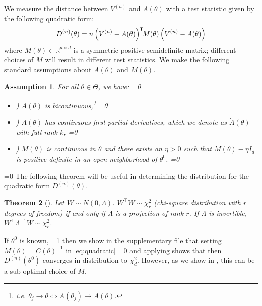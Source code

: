 \documentclass[twoside,letterpaper]{article} \usepackage{aistats2017}
\newtheorem{theorem}{Theorem}[section]
\newtheorem{assumpt}[theorem]{Assumption}
\theoremstyle{definition}
\theoremstyle{remark}
\begin{document}
 We measure the distance between ${V^{({n})}}$ and $A(\theta)$ with a test statistic given by the following quadratic form:
\begin{equation}
{D^{({n})}}(\theta) = n \left({V^{({n})}} - A(\theta) \right)^\intercal \hspace{-0.3em}M(\theta) \left( {V^{({n})}} - A(\theta)\right)
\label{eq:quadratic}
\end{equation}
where $M(\theta) \in {\mathbb{R}}^{d\times d}$ is a symmetric positive-semidefinite matrix; different choices of $M$ will result in different test statistics.
We make the following standard assumptions about $A(\theta)$ and $M(\theta)$. 
\begin{assumpt} For all $\theta \in \Theta$, we have:
=0
\begin{itemize}
\item {}) \fi $A(\theta)$ is bicontinuous,\footnote{i.e. $\theta_j\rightarrow\theta\Leftrightarrow A(\theta_j)\rightarrow A(\theta)$.}
=0 \item {}) \fi  $A(\theta)$ has continuous first partial derivatives, which we denote as $\dot{ A}(\theta)$ with full rank $k$,
=0 \item {}) \fi  $M(\theta)$ is continuous in $\theta$ and there exists an $\eta >0$ such that $M(\theta) - \eta I_d$ is positive definite in an open neighborhood of ${\theta^0}$.
=0
\end{itemize}
\fi
\label{assumpt:mean}
\end{assumpt} 

=0
The following theorem will be useful in determining the distribution for the quadratic form ${D^{({n})}}(\theta)$.
\begin{theorem}[\cite{Ferg96}]
Let $W \sim N(0,\Lambda)$. $W^\intercal W \sim \chi_r^2$ (chi-square distribution with $r$ degrees of freedom) if and only if $\Lambda$ is a projection of rank $r$. If $\Lambda$ is invertible, $W^\intercal\Lambda^{-1}W\sim\chi_r^2$.
\label{thm:chi2}
\end{theorem}
\fi
If ${\theta^0}$ is known, =1 then we show in the supplementary file that \fi setting $M(\theta)  = C(\theta)^{-1}$ in  \eqref{eq:quadratic} =0 and applying  shows that \fi then ${D^{({n})}}({\theta^0})$ converges in distribution to $\chi^2_{d}$. However, as we show in , this can be a sub-optimal choice of $M$.
\end{document}
